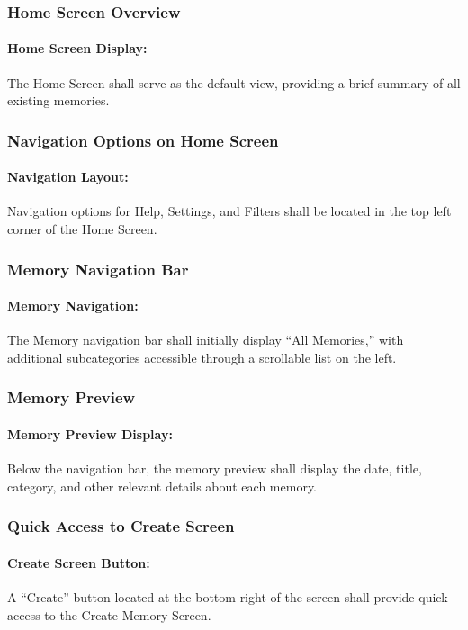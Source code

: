 \documentclass{article}
\begin{document}
\subsubsection*{Home Screen Overview}
\addtocounter{subsubsection}{1}
\paragraph{Home Screen Display:} The Home Screen shall serve as the default view, providing a brief summary of all existing memories.
\subsubsection*{Navigation Options on Home Screen}
\addtocounter{subsubsection}{1}
\paragraph{Navigation Layout:} Navigation options for Help, Settings, and Filters shall be located in the top left corner of the Home Screen.
\subsubsection*{Memory Navigation Bar}
\addtocounter{subsubsection}{1}
\paragraph{Memory Navigation:} The Memory navigation bar shall initially display “All Memories,” with additional subcategories accessible through a scrollable list on the left.
\subsubsection*{Memory Preview}
\addtocounter{subsubsection}{1}
\paragraph{Memory Preview Display:} Below the navigation bar, the memory preview shall display the date, title, category, and other relevant details about each memory.
\subsubsection*{Quick Access to Create Screen}
\addtocounter{subsubsection}{1}
\paragraph{Create Screen Button:} A “Create” button located at the bottom right of the screen shall provide quick access to the Create Memory Screen.
\end{document}
